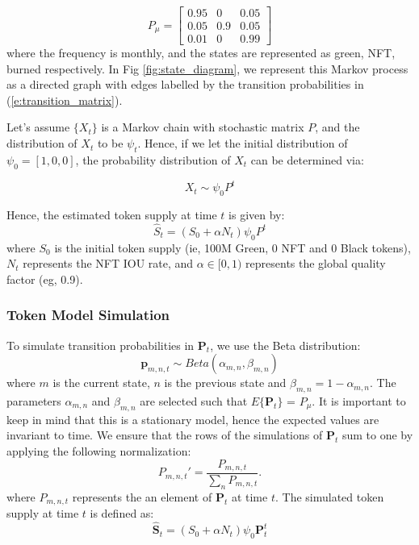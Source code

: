 \documentclass{article}
\begin{document}
\begin{equation}
P_{\mu} = 
\begin{bmatrix}
0.95 & 0  & 0.05 \\
0.05 & 0.9  & 0.05 \\
0.01 & 0 & 0.99
\end{bmatrix}
\label{e:transition_matrix}
\end{equation}
where the frequency is monthly, and the states are represented as green, NFT, burned respectively. In Fig \ref{fig:state_diagram}, we represent this Markov process as a directed graph with edges labelled by the transition probabilities in (\ref{e:transition_matrix}).

Let's assume $\{X_{t}\}$ is a Markov chain with stochastic matrix $P$, and the distribution of $X_{t}$ to be $\psi_{t}$. Hence, if we let the initial distribution of $\psi_{0} = [1,0,0]$, the probability distribution of $X_{t}$ can be determined via:

\begin{equation}
X_{t} \sim \psi_{0}P^{t}
\label{e:pow_vs_pos}
\end{equation}

Hence, the estimated token supply at time $t$ is given by:
\begin{equation}
\hat{S}_{t} = (S_{0} + \alpha N_{t})\psi_{0}P^{t}
\label{e:token_supply}
\end{equation}
where $S_{0}$ is the initial token supply (ie, 100M Green, 0 NFT and 0 Black tokens), $N_{t}$ represents the NFT IOU rate, and $\alpha \in [0,1)$ represents the global quality factor (eg, 0.9).

\subsubsection{Token Model Simulation}

To simulate transition probabilities in $\mathbf{P}_{t}$, we use the Beta distribution:
\begin{equation}
\mathbf{p}_{m,n,t} \sim Beta(\alpha_{m,n},\beta_{m,n})
\end{equation}
where $m$ is the current state, $n$ is the previous state and $\beta_{m,n} = 1-\alpha_{m,n}$. The parameters $\alpha_{m,n}$ and $\beta_{m,n}$ are selected such that $E\{\mathbf{P}_{t}\}$ = $P_{\mu}$. It is important to keep in mind that this is a stationary model, hence the expected values are invariant to time. We ensure that the rows of the simulations of $\mathbf{P}_{t}$ sum to one by applying the following normalization:
\begin{equation}
P_{m,n,t}'= \dfrac{P_{m,n,t} }{  \sum_{n} P_{m,n,t}  }.
\end{equation}
where $P_{m,n,t}$ represents the an element of $\mathbf{P}_{t}$ at time $t$. The simulated token supply  at time $t$ is defined as:
\begin{equation}
\hat{\mathbf{S}}_{t} =(S_{0} + \alpha N_{t})\psi_{0}\mathbf{P}_{t}^{t}
\label{e:token_supply_simulation}
\end{equation}
\end{document}
